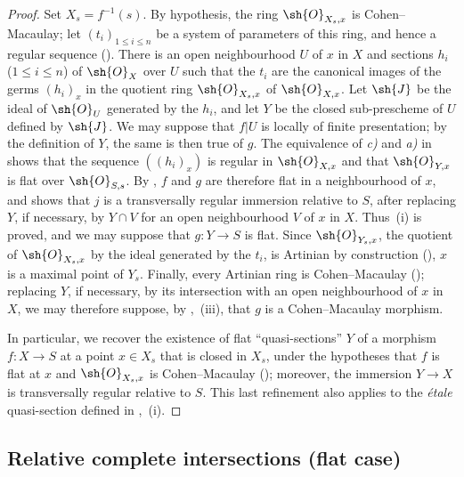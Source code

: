 \begin{proof}
Set $X_s=f^{-1}(s)$. By hypothesis, the ring $\sh{O}_{X_s,x}$ is Cohen--Macaulay; let $(t_i)_{1\leq i\leq n}$ be a system of parameters of this ring, and hence a regular sequence ().
There is an open neighbourhood $U$ of $x$ in $X$ and sections $h_i$ ($1\leq i\leq n$) of $\sh{O}_X$ over $U$ such that the $t_i$ are the canonical images of the germs $(h_i)_x$ in the quotient ring $\sh{O}_{X_s,x}$ of $\sh{O}_{X,x}$.
Let $\sh{J}$ be the ideal of $\sh{O}_U$ generated by the $h_i$, and let $Y$ be the closed sub-prescheme of $U$ defined by $\sh{J}$.
We may suppose that $f|U$ is locally of finite presentation; by the definition of $Y$, the same is then true of $g$.
The equivalence of \emph{c)} and \emph{a)} in  shows that the sequence $((h_i)_x)$ is regular in $\sh{O}_{X,x}$ and that $\sh{O}_{Y,x}$ is flat over $\sh{O}_{S,s}$. By , $f$ and $g$ are therefore flat in a neighbourhood of $x$, and  shows that $j$ is a transversally regular immersion relative to $S$, after replacing $Y$, if necessary, by $Y\cap V$ for an open neighbourhood $V$ of $x$ in $X$.
Thus~(i) is proved, and we may suppose that $g:Y\to S$ is flat.
Since $\sh{O}_{Y_s,x}$, the quotient of $\sh{O}_{X_s,x}$ by the ideal generated by the $t_i$, is Artinian by construction (), $x$ is a maximal point of $Y_s$.
Finally, every Artinian ring is Cohen--Macaulay (); replacing $Y$, if necessary, by its intersection with an open neighbourhood of $x$ in $X$, we may therefore suppose, by ,~(iii), that $g$ is a Cohen--Macaulay morphism.

In particular, we recover the existence of flat ``quasi-sections'' $Y$ of a morphism $f:X\to S$ at a point $x\in X_s$ that is closed in $X_s$, under the hypotheses that $f$ is flat at $x$ and $\sh{O}_{X_s,x}$ is Cohen--Macaulay (); moreover, the immersion $Y\to X$ is transversally regular relative to $S$.
This last refinement also applies to the \emph{\'etale} quasi-section defined in ,~(i).
\end{proof}

\subsection{Relative complete intersections (flat case)}
\label{subsection:IV.19.3}


